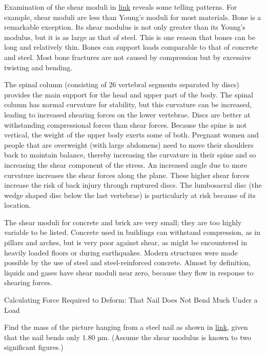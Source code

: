 \documentclass[
]{book}
\begin{document}
Examination of the shear moduli in
\protect\hyperlink{import-auto-id1165298671576}{link} reveals
some telling patterns. For example, shear moduli are less than Young's
moduli for most materials. Bone is a remarkable exception. Its shear
modulus is not only greater than its Young's modulus, but it is as
large as that of steel. This is one reason that bones can be long and
relatively thin. Bones can support loads comparable to that of concrete
and steel. Most bone fractures are not caused by compression but by
excessive twisting and bending.

The spinal column (consisting of 26 vertebral segments separated by
discs) provides the main support for the head and upper part of the
body. The spinal column has normal curvature for stability, but this
curvature can be increased, leading to increased shearing forces on the
lower vertebrae. Discs are better at withstanding compressional forces
than shear forces. Because the spine is not vertical, the weight of the
upper body exerts some of both. Pregnant women and people that are
overweight (with large abdomens) need to move their shoulders back to
maintain balance, thereby increasing the curvature in their spine and so
increasing the shear component of the stress. An increased angle due to
more curvature increases the shear forces along the plane. These higher
shear forces increase the risk of back injury through ruptured discs.
The lumbosacral disc (the wedge shaped disc below the last vertebrae) is
particularly at risk because of its location.

The shear moduli for concrete and brick are very small; they are too
highly variable to be listed. Concrete used in buildings can withstand
compression, as in pillars and arches, but is very poor against shear,
as might be encountered in heavily loaded floors or during earthquakes.
Modern structures were made possible by the use of steel and
steel-reinforced concrete. Almost by definition, liquids and gases have
shear moduli near zero, because they flow in response to shearing
forces.

\hypertarget{fs-id1165296288315}{}
Calculating Force Required to Deform: That Nail Does Not Bend Much Under
a Load

Find the mass of the picture hanging from a steel nail as shown in
\protect\hyperlink{import-auto-id1165298644588}{link}, given that
the nail bends only \(\text{1.80\ µm}{}\). (Assume the shear modulus is
known to two significant figures.)
\end{document}
